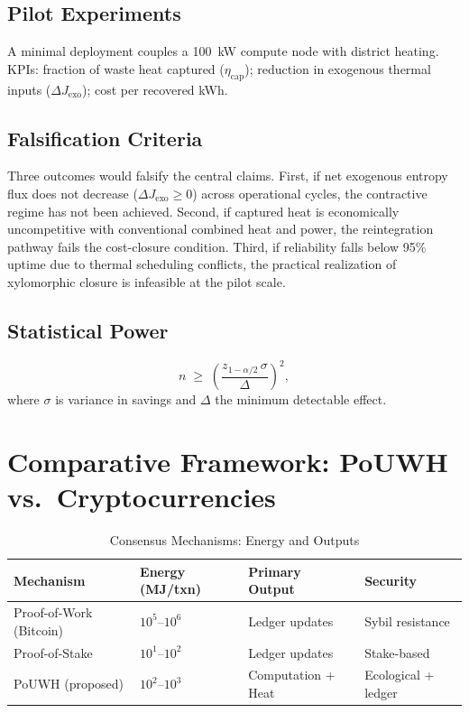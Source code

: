 \documentclass[11pt,a4paper]{article}
\theoremstyle{plain}
\theoremstyle{definition}
\theoremstyle{remark}
\begin{document}
\subsection{Pilot Experiments}

A minimal deployment couples a 100~kW compute node with district heating.
KPIs: fraction of waste heat captured ($\eta_{\mathrm{cap}}$); reduction in
exogenous thermal inputs ($\Delta J_{\mathrm{exo}}$); cost per recovered kWh.

\subsection{Falsification Criteria}

Three outcomes would falsify the central claims. First, if net exogenous entropy flux does not decrease ($\Delta J_{\mathrm{exo}} \geq 0$) across operational cycles, the contractive regime has not been achieved. Second, if captured heat is economically uncompetitive with conventional combined heat and power, the reintegration pathway fails the cost-closure condition. Third, if reliability falls below 95\% uptime due to thermal scheduling conflicts, the practical realization of xylomorphic closure is infeasible at the pilot scale.

\subsection{Statistical Power}

\[
  n \;\geq\; \left(\frac{z_{1-\alpha/2}\,\sigma}{\Delta}\right)^2,
\]
where $\sigma$ is variance in savings and $\Delta$ the minimum detectable
effect.

\section{Comparative Framework: PoUWH vs.\ Cryptocurrencies}
\label{app:crypto}

\begin{table}[h]
\centering
\caption{Consensus Mechanisms: Energy and Outputs}
\label{tab:consensus}
\begin{tabular}{p{4cm}p{3cm}p{3.5cm}p{3cm}}
\toprule
Mechanism & Energy (MJ/txn) & Primary Output & Security \\
\midrule
Proof-of-Work (Bitcoin) & $10^5$--$10^6$ & Ledger updates & Sybil resistance \\
Proof-of-Stake          & $10^1$--$10^2$ & Ledger updates & Stake-based \\
PoUWH (proposed)        & $10^2$--$10^3$ & Computation + Heat & Ecological + ledger \\
\bottomrule
\end{tabular}
\end{table}
\end{document}
